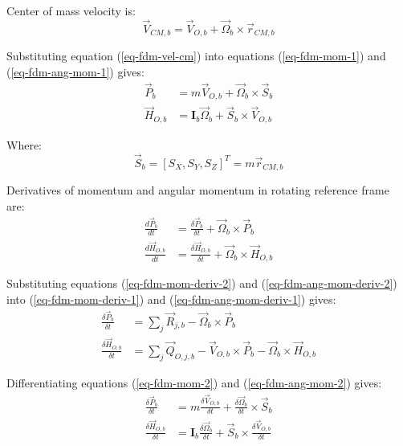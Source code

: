 Center of mass velocity is:
\begin{equation}
  \label{eq-fdm-vel-cm}
  {\vec V}_{CM,b}
  =
  {\vec V}_{O,b} + {\vec \Omega}_b \times {\vec r}_{CM,b}
\end{equation}

Substituting equation (\ref{eq-fdm-vel-cm}) into equations (\ref{eq-fdm-mom-1}) and (\ref{eq-fdm-ang-mom-1}) gives:
\begin{align}
  \label{eq-fdm-mom-2} 
  {\vec P}_b
  &=
  m {\vec V}_{O,b} + {\vec \Omega}_b
  \times
  {\vec S}_b \\
  \label{eq-fdm-ang-mom-2}
  {\vec H}_{O,b}
  &=
  {\boldsymbol I}_b {\vec \Omega}_b
  +
  {\vec S}_b \times {\vec V}_{O,b}
\end{align}

Where:
\begin{equation}
  {\vec S}_b = \left[ S_X, S_Y, S_Z \right]^T = m {\vec r}_{CM,b}
\end{equation}

Derivatives of momentum and angular momentum in rotating reference frame are: \cite{Taylor2005, Osinski1997, Leyko2002}
\begin{align}
  \label{eq-fdm-mom-deriv-2} 
  \frac{d {\vec P}_b}{dt}
  &=
  \frac{\delta {\vec P}_b}{\delta t}
  +
  {\vec \Omega}_b \times {\vec P}_b \\
  \label{eq-fdm-ang-mom-deriv-2}
  \frac{d {\vec H}_{O,b}}{dt}
  &=
  \frac{\delta {\vec H}_{O,b}}{\delta t}
  +
  {\vec \Omega}_b \times {\vec H}_{O,b}
\end{align}

Substituting equations (\ref{eq-fdm-mom-deriv-2}) and (\ref{eq-fdm-ang-mom-deriv-2}) into (\ref{eq-fdm-mom-deriv-1}) and (\ref{eq-fdm-ang-mom-deriv-1}) gives:
\begin{align}
  \label{eq-fdm-mom-deriv-3}
  \frac{\delta {\vec P}_b}{\delta t}
  &=
  \sum_{j} {\vec R}_{j,b}
  -
  {\vec \Omega}_b \times {\vec P}_b \\
  \label{eq-fdm-ang-mom-deriv-3}
  \frac{\delta {\vec H}_{O,b}}{\delta t}
  &=
  \sum_{j} {\vec Q}_{O,j,b}
  -
  {\vec V}_{O,b} \times {\vec P}_b
  -
  {\vec \Omega}_b \times {\vec H}_{O,b}
\end{align}

Differentiating equations (\ref{eq-fdm-mom-2}) and (\ref{eq-fdm-ang-mom-2}) gives:
\begin{align}
  \label{eq-fdm-mom-deriv-4}
  \frac{\delta {\vec P}_b}{\delta t}
  &=
  m \frac{\delta {\vec V}_{O,b}}{\delta t}
  +
  \frac{\delta {\vec \Omega}_b}{\delta t}
  \times
  {\vec S}_b \\
  \label{eq-fdm-ang-mom-deriv-4}
  \frac{\delta {\vec H}_{O,b}}{\delta t}
  &=
  {\boldsymbol I}_b \frac{\delta {\vec \Omega}_b}{\delta t}
  +
  {\vec S}_b
  \times
  \frac{\delta {\vec V}_{O,b}}{\delta t}
\end{align}

